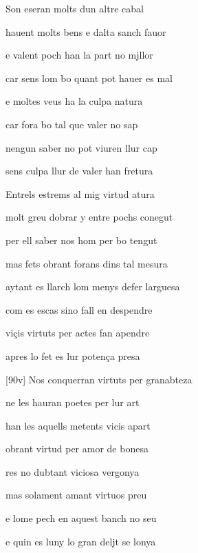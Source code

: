 \documentclass[12pt]{article}
\begin{document}
\begin{estrofa}

 Son eseran molts dun altre cabal

 hauent molts bens e dalta sanch fauor

 e valent poch han la part no mjllor

 car sens lom bo quant pot hauer es mal

 e moltes veus ha la culpa natura

 car fora bo tal que valer no sap

 nengun saber no pot viuren llur cap

 sens culpa llur de valer han fretura

\end{estrofa}



\begin{estrofa}

 Entrels estrems al mig virtud atura

 molt greu dobrar y entre pochs conegut

 per ell saber nos hom per bo tengut

 mas fets obrant forans dins tal mesura

 aytant es llarch lom menys defer larguesa

 com es escas sino fall en despendre

 vi\c{c}is virtuts per actes fan apendre

 apres lo fet es lur poten\c{c}a presa

\end{estrofa}



\begin{estrofa}

 [90v] Nos conquerran virtuts per granabteza

 ne les hauran poetes per lur art

 han les aquells metents vicis apart

 obrant virtud per amor de bonesa

 res no dubtant viciosa vergonya

 mas solament amant virtuos preu

 e lome pech en aquest banch no seu

 e quin es luny lo gran deljt se lonya

\end{estrofa}
\end{document}
